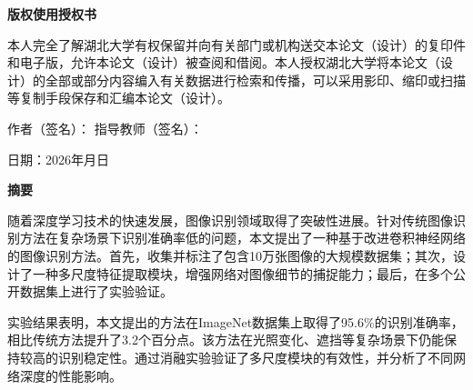 \documentclass[a4paper,12pt]{article}
\begin{document}
\newpage
\thispagestyle{empty}
\begin{center}
{\bfseries 版权使用授权书}
\end{center}

\vspace{1cm}

{\setlength{\parindent}{2em}
本人完全了解湖北大学有权保留并向有关部门或机构送交本论文（设计）的复印件和电子版，允许本论文（设计）被查阅和借阅。本人授权湖北大学将本论文（设计）的全部或部分内容编入有关数据进行检索和传播，可以采用影印、缩印或扫描等复制手段保存和汇编本论文（设计）。

\vspace{2cm}

\noindent 作者（签名）：\hspace{5em} 指导教师（签名）：

\vspace{1cm}

\noindent 日\hspace{2em}期：2026年\hspace{2em}月\hspace{2em}日
}

\newpage
{}

\thispagestyle{plain}
{}

\begin{center}
    {\bfseries 摘\hspace{4\ccwd}要}
\end{center}

\vspace{0.5cm}

随着深度学习技术的快速发展，图像识别领域取得了突破性进展。针对传统图像识别方法在复杂场景下识别准确率低的问题，本文提出了一种基于改进卷积神经网络的图像识别方法。首先，收集并标注了包含10万张图像的大规模数据集；其次，设计了一种多尺度特征提取模块，增强网络对图像细节的捕捉能力；最后，在多个公开数据集上进行了实验验证。

实验结果表明，本文提出的方法在ImageNet数据集上取得了95.6\%的识别准确率，相比传统方法提升了3.2个百分点。该方法在光照变化、遮挡等复杂场景下仍能保持较高的识别稳定性。通过消融实验验证了多尺度模块的有效性，并分析了不同网络深度的性能影响。
\end{document}
